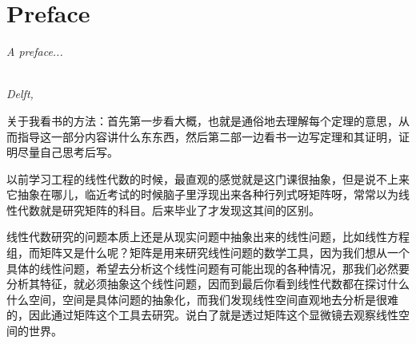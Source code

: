 \chapter*{Preface}

\emph{A preface...}

\begin{flushright}
{\makeatletter\itshape
    \@author \\
    Delft, \monthname{} \the\year{}
\makeatother}
\end{flushright}

关于我看书的方法：首先第一步看大概，也就是通俗地去理解每个定理的意思，从而指导这一部分内容讲什么东东西，然后第二部一边看书一边写定理和其证明，证明尽量自己思考后写。

以前学习工程的线性代数的时候，最直观的感觉就是这门课很抽象，但是说不上来它抽象在哪儿，临近考试的时候脑子里浮现出来各种行列式呀矩阵呀，常常以为线性代数就是研究矩阵的科目。后来毕业了才发现这其间的区别。

线性代数研究的问题本质上还是从现实问题中抽象出来的线性问题，比如线性方程组，而矩阵又是什么呢？矩阵是用来研究线性问题的数学工具，因为我们想从一个具体的线性问题，希望去分析这个线性问题有可能出现的各种情况，那我们必然要分析其特征，就必须抽象这个线性问题，因而到最后你看到线性代数都在探讨什么什么空间，空间是具体问题的抽象化，而我们发现线性空间直观地去分析是很难的，因此通过矩阵这个工具去研究。说白了就是透过矩阵这个显微镜去观察线性空间的世界。








